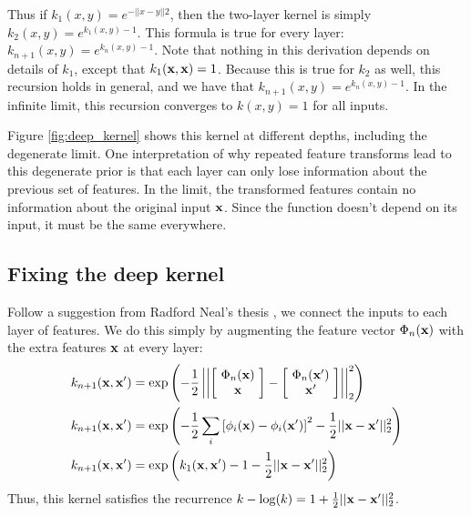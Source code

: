 \documentclass{article}
\begin{document}
%
Thus if $k_1(x,y) = e^{-||x - y||2}$, then the two-layer kernel is simply $k_2(x,y) = e^{k_1(x, y) - 1}$.  This formula is true for every layer: $k_{n+1}(x,y) = e^{k_n(x, y) - 1}$.
%
Note that nothing in this derivation depends on details of $k_1$, except that $k_1( {\bf{x}}, {\bf{x}}) = 1$.  Because this is true for $k_2$ as well, this recursion holds in general, and we have that $k_{n+1}(x,y) = e^{k_n(x, y) - 1}$.  In the infinite limit, this recursion converges to $k(x,y) = 1$ for all inputs.

Figure \ref{fig:deep_kernel} shows this kernel at different depths, including the degenerate limit.  One interpretation of why repeated feature transforms lead to this degenerate prior is that each layer can only lose information about the previous set of features.  In the limit, the transformed features contain no information about the original input ${\bf{x}}$.  Since the function doesn't depend on its input, it must be the same everywhere.



\subsection{Fixing the deep kernel}

Follow a suggestion from Radford Neal's thesis \cite{neal1995bayesian}, we connect the inputs to each layer of features.  We do this simply by augmenting the feature vector $\Phi_n({\bf{x}})$ with the extra features ${\bf{x}}$ at every layer:
%
\begin{align}
k_{n+1}({\bf{x}}, {\bf{x}}') & = \exp \left( -\frac{1}{2} \left|\left| \left[ \! \begin{array}{c} \Phi_n({\bf{x}}) \\ {\bf{x}} \end{array} \! \right]  - \left[ \! \begin{array}{c} \Phi_n({\bf{x}}') \\ {\bf{x}}' \end{array} \! \right] \right| \right|_2^2 \right) \\
k_{n+1}({\bf{x}}, {\bf{x}}') & = \exp \left( -\frac{1}{2} \sum_i \left[ \phi_i({\bf{x}}) - \phi_i({\bf{x}}') \right]^2 -\frac{1}{2} || {\bf{x}} - {\bf{x}}' ||_2^2 \right) \\
k_{n+1}({\bf{x}}, {\bf{x}}') & = \exp \left( k_1({\bf{x}}, {\bf{x}}') - 1 -\frac{1}{2} || {\bf{x}} - {\bf{x}}' ||_2^2 \right)
\end{align}
%
Thus, this kernel satisfies the recurrence $k - \log(k) = 1 + \frac{1}{2} || {\bf{x}} - {\bf{x}}' ||_2^2$.  
\end{document}

